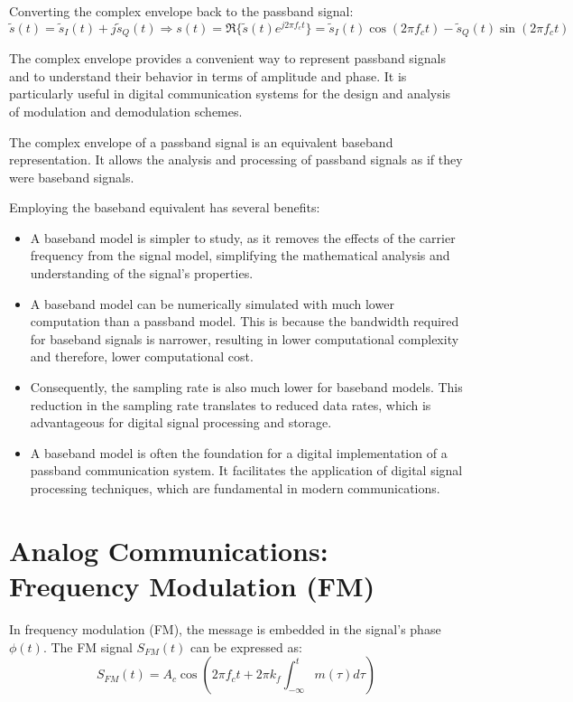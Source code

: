 Converting the complex envelope back to the passband signal:
\begin{equation}
    \tilde{s}(t) = \tilde{s}_I(t) + j\tilde{s}_Q(t) \Rightarrow s(t) = \Re\{\tilde{s}(t)e^{j2\pi f_c t}\} = \tilde{s}_I(t)\cos(2\pi f_c t) - \tilde{s}_Q(t)\sin(2\pi f_c t)
\end{equation}

The complex envelope provides a convenient way to represent passband signals and to understand their behavior in terms of amplitude and phase. It is particularly useful in digital communication systems for the design and analysis of modulation and demodulation schemes.


The complex envelope of a passband signal is an equivalent baseband representation. It allows the analysis and processing of passband signals as if they were baseband signals.

Employing the baseband equivalent has several benefits:
\begin{itemize}
    \item A baseband model is simpler to study, as it removes the effects of the carrier frequency from the signal model, simplifying the mathematical analysis and understanding of the signal's properties.
    \item A baseband model can be numerically simulated with much lower computation than a passband model. This is because the bandwidth required for baseband signals is narrower, resulting in lower computational complexity and therefore, lower computational cost.
    \item Consequently, the sampling rate is also much lower for baseband models. This reduction in the sampling rate translates to reduced data rates, which is advantageous for digital signal processing and storage.
    \item A baseband model is often the foundation for a digital implementation of a passband communication system. It facilitates the application of digital signal processing techniques, which are fundamental in modern communications.
\end{itemize}


\section*{Analog Communications: Frequency Modulation (FM)}

In frequency modulation (FM), the message is embedded in the signal's phase \( \phi(t) \). The FM signal \( S_{FM}(t) \) can be expressed as:
\begin{equation}
    S_{FM}(t) = A_c \cos\left(2\pi f_c t + 2\pi k_f \int_{-\infty}^{t} m(\tau) d\tau \right)
\end{equation}

